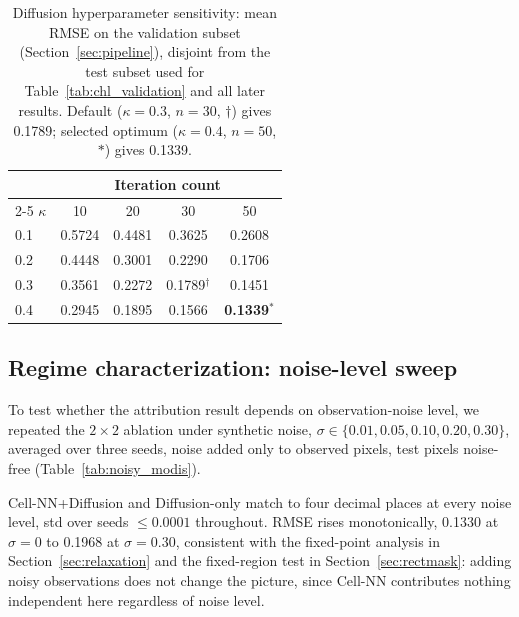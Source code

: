 \documentclass[final,5p,times,twocolumn,authoryear]{elsarticle}
\begin{document}
\begin{table}[t]
\centering
\small
\caption{Diffusion hyperparameter sensitivity: mean RMSE on the
validation subset (Section~\ref{sec:pipeline}), disjoint from the
test subset used for Table~\ref{tab:chl_validation} and all later
results. Default ($\kappa=0.3$, $n=30$, $\dag$) gives 0.1789;
selected optimum ($\kappa=0.4$, $n=50$, $\ast$) gives 0.1339.}
\label{tab:diff_sensitivity}
\begin{tabular}{lcccc}
\toprule
 & \multicolumn{4}{c}{Iteration count} \\
\cmidrule(lr){2-5}
$\kappa$ & 10 & 20 & 30 & 50 \\
\midrule
0.1 & 0.5724 & 0.4481 & 0.3625 & 0.2608 \\
0.2 & 0.4448 & 0.3001 & 0.2290 & 0.1706 \\
0.3 & 0.3561 & 0.2272 & 0.1789$^\dag$ & 0.1451 \\
0.4 & 0.2945 & 0.1895 & 0.1566 & \textbf{0.1339}$^\ast$ \\
\bottomrule
\end{tabular}
\end{table}

\subsection{Regime characterization: noise-level sweep}
\label{sec:noisesweep}

To test whether the attribution result depends on observation-noise
level, we repeated the $2\times2$ ablation under synthetic noise, $\sigma \in
\{0.01, 0.05, 0.10, 0.20, 0.30\}$, averaged over three seeds, noise
added only to observed pixels, test pixels noise-free
(Table~\ref{tab:noisy_modis}).

Cell-NN+Diffusion and Diffusion-only match to four decimal places at
every noise level, std over seeds $\leq 0.0001$ throughout. RMSE
rises monotonically, 0.1330 at $\sigma=0$ to 0.1968 at $\sigma=0.30$,
consistent with the fixed-point analysis in
Section~\ref{sec:relaxation} and the fixed-region test in
Section~\ref{sec:rectmask}: adding noisy observations does not
change the picture, since Cell-NN contributes nothing independent
here regardless of noise level.
\end{document}
